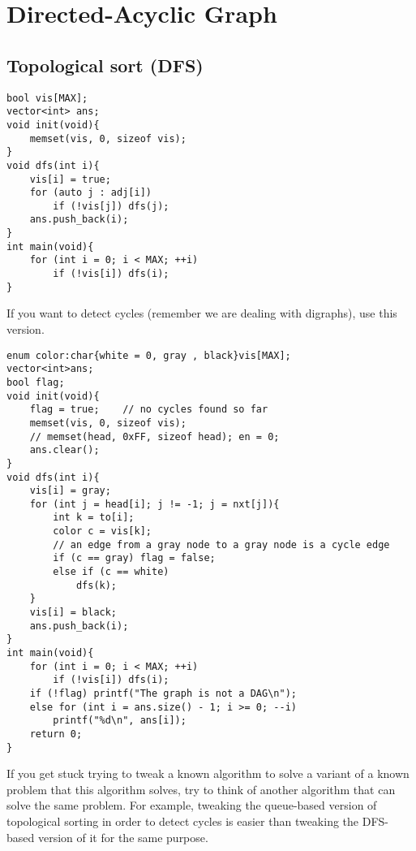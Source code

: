 \documentclass[12pt]{book}
\begin{document}
\chapter{Directed-Acyclic Graph}
\section{Topological sort (DFS)}
\begin{verbatim}
bool vis[MAX];
vector<int> ans;
void init(void){
	memset(vis, 0, sizeof vis);
}
void dfs(int i){
	vis[i] = true;
	for (auto j : adj[i])
		if (!vis[j]) dfs(j);
	ans.push_back(i);
}
int main(void){
	for (int i = 0; i < MAX; ++i)
		if (!vis[i]) dfs(i);
}
\end{verbatim}
If you want to detect cycles (remember we are dealing with digraphs), use this version.
\begin{verbatim}
enum color:char{white = 0, gray , black}vis[MAX];
vector<int>ans;
bool flag;
void init(void){
	flag = true;	// no cycles found so far
	memset(vis, 0, sizeof vis);
	// memset(head, 0xFF, sizeof head); en = 0;
	ans.clear();
}
void dfs(int i){
	vis[i] = gray;
	for (int j = head[i]; j != -1; j = nxt[j]){
		int k = to[i];
		color c = vis[k];
		// an edge from a gray node to a gray node is a cycle edge
		if (c == gray) flag = false;
		else if (c == white)
			dfs(k);
	}
	vis[i] = black;
	ans.push_back(i);
}
int main(void){
	for (int i = 0; i < MAX; ++i)
		if (!vis[i]) dfs(i);
	if (!flag) printf("The graph is not a DAG\n");
	else for (int i = ans.size() - 1; i >= 0; --i)
		printf("%d\n", ans[i]);
	return 0;
}
\end{verbatim}
If you get stuck trying to tweak a known algorithm to solve a variant of a known problem that this algorithm solves, try to think of another algorithm that can solve the same problem. For example, tweaking the queue-based version of topological sorting in order to detect cycles is easier than tweaking the DFS-based version of it for the same purpose.
\end{document}
